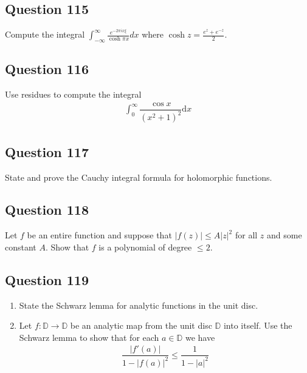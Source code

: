 \documentclass[12pt]{article}
\begin{document}
\hypertarget{question-115-1}{%
\subsection{Question 115}\label{question-115-1}}

Compute the integral
\(\displaystyle{\int_{-\infty}^{\infty} \frac{e^{-2\pi ix\xi}}{\cosh\pi x}dx}\)
where \(\displaystyle{\cosh z=\frac{e^{z}+e^{-z}}{2}}\).

\hypertarget{question-116-1}{%
\subsection{Question 116}\label{question-116-1}}

Use residues to compute the integral \begin{align*}
\int_{0}^{\infty} \dfrac{\cos x}{(x^2+1)^2} \mathrm{d}x
\end{align*}

\hypertarget{question-117-1}{%
\subsection{Question 117}\label{question-117-1}}

State and prove the Cauchy integral formula for holomorphic functions.

\hypertarget{question-118-1}{%
\subsection{Question 118}\label{question-118-1}}

Let \(f\) be an entire function and suppose that \(|f(z)| \leq A|z|^2\)
for all \(z\) and some constant \(A\). Show that \(f\) is a polynomial
of degree \(\leq 2\).

\hypertarget{question-119-1}{%
\subsection{Question 119}\label{question-119-1}}

\begin{enumerate}
\def\labelenumi{\arabic{enumi}.}
\item
  State the Schwarz lemma for analytic functions in the unit disc.
\item
  Let \(f: \mathbb{D} \to \mathbb{D}\) be an analytic map from the unit
  disc \(\mathbb{D}\) into itself. Use the Schwarz lemma to show that
  for each \(a\in \mathbb{D}\) we have \begin{align*}
  \dfrac{|f'(a)|}{1-|f(a)|^2} \leq \dfrac{1}{1-|a|^2}
  \end{align*}
\end{enumerate}
\end{document}
